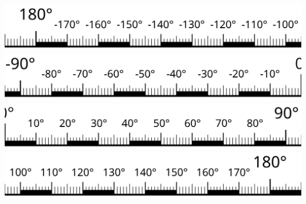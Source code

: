 \documentclass{article}
\begin{document}
\noindent
\includegraphics[width=25cm]{../post_processing/segments_1.png}\\
\includegraphics[width=25cm]{../post_processing/segments_2.png}\\
\includegraphics[width=25cm]{../post_processing/segments_3.png}\\
\includegraphics[width=25cm]{../post_processing/segments_4.png}
\end{document}
